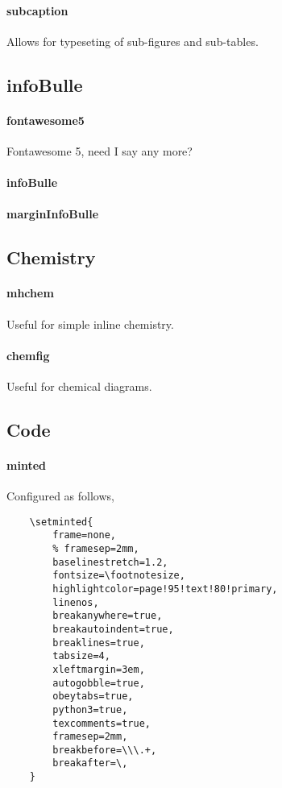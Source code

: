 \documentclass[solid,math,chem,code,plot,gloss]{bmc}
\begin{document}
\paragraph{\ttfamily subcaption}\label{par:subcaption}
Allows for typeseting of sub-figures and sub-tables.

\subsection{infoBulle}

\paragraph{\ttfamily fontawesome5}\label{par:fontawesome5}
Fontawesome 5, need I say any more?
\paragraph{\ttfamily infoBulle}\label{par:infoBulle}
\paragraph{\ttfamily marginInfoBulle}\label{par:marginInfoBulle}

\subsection{Chemistry}

\paragraph{\ttfamily mhchem}\label{par:mhchem}
Useful for simple inline chemistry.
\paragraph{\ttfamily chemfig}\label{par:chemfig}
Useful for chemical diagrams.

\subsection{Code}

\paragraph{\ttfamily minted}\label{par:minted}
Configured as follows,
\begin{verbatim}
    \setminted{
        frame=none,
        % framesep=2mm,
        baselinestretch=1.2,
        fontsize=\footnotesize,
        highlightcolor=page!95!text!80!primary,
        linenos,
        breakanywhere=true,
        breakautoindent=true,
        breaklines=true,
        tabsize=4,
        xleftmargin=3em,
        autogobble=true,
        obeytabs=true,
        python3=true,
        texcomments=true,
        framesep=2mm,
        breakbefore=\\\.+,
        breakafter=\,
    }
\end{verbatim}
\end{document}
